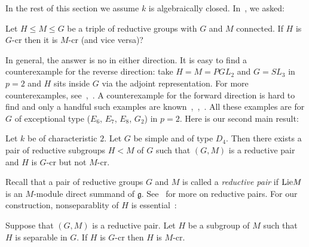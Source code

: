 In the rest of this section we assume $k$ is algebraically closed. In~\cite{Uchiyama-Separability-JAlgebra}, we asked:
\begin{question}\label{G-cr-M-cr-Q}
Let $H\leq M\leq G$ be a triple of reductive groups with $G$ and $M$ connected. If $H$ is $G$-cr then it is $M$-cr (and vice versa)?
\end{question} 
In general, the answer is no in either direction. It is easy to find a counterexample for the reverse direction: take $H=M=PGL_2$ and $G=SL_3$ in $p=2$ and $H$ sits inside $G$ via the adjoint representation. For more counterexamples, see~\cite{Liebeck-Seitz-memoir},~\cite{Stewart-nonGcr}. A counterexample for the forward direction is hard to find and only a handful such examples are known~\cite[Thm.~1.1]{Uchiyama-Separability-JAlgebra},~\cite[Thm.~1.2]{Uchiyama-Classification-pre},~\cite[Sec.~6]{Bate-separability-TransAMS}. All these examples are for $G$ of exceptional type ($E_6$, $E_7$, $E_8$, $G_2$) in $p=2$. Here is our second main result:
\begin{thm}\label{G-cr-M-cr}
Let $k$ be of characteristic $2$. Let $G$ be simple and of type $D_4$. Then there exists a pair of reductive subgroups $H<M$ of $G$ such that $(G,M)$ is a reductive pair and $H$ is $G$-cr but not $M$-cr.
\end{thm}
Recall that a pair of reductive groups $G$ and $M$ is called a \emph{reductive pair} if $\textup{Lie} M$ is an $M$-module direct summand of $\mathfrak{g}$. See~\cite{Goodbourn-reductivepairs} for more on reductive pairs. For our construction, nonseparablity of $H$ is essential~\cite[Thm.~1.4]{Bate-separability-TransAMS}: 
\begin{prop}
Suppose that $(G,M)$ is a reductive pair. Let $H$ be a subgroup of $M$ such that $H$ is separable in $G$. If $H$ is $G$-cr then $H$ is $M$-cr. 
\end{prop}

